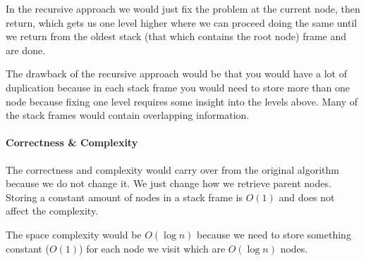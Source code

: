 \documentclass[12pt, a4paper]{article}
\begin{document}
In the recursive approach we would just fix the problem at the current node, then return, which gets us one level higher where we can proceed doing the same until we return from the oldest stack (that which contains the root node) frame and are done.

The drawback of the recursive approach would be that you would have a lot of duplication because in each stack frame you would need to store more than one node because fixing one level requires some insight into the levels above. Many of the stack frames would contain overlapping information.

\paragraph{Correctness \& Complexity}
The correctness and complexity would carry over from the original algorithm because we do not change it. We just change how we retrieve parent nodes. Storing a constant amount of nodes in a stack frame is $O(1)$ and does not affect the complexity.

The space complexity would be $O(\log n)$ because we need to store something constant ($O(1)$) for each node we visit which are $O(\log n)$ nodes.

\section{} %
\end{document}
